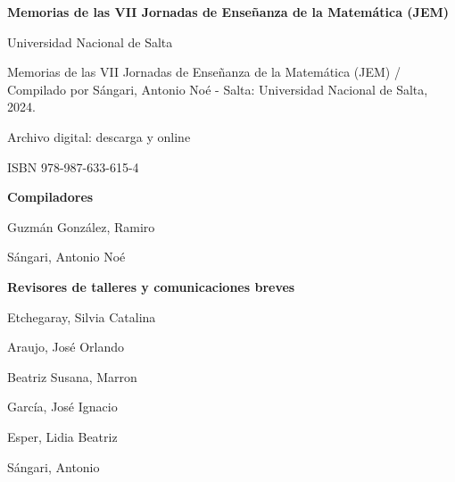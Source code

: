 \begin{center}
	\LARGE \bfseries \sffamily
	Memorias de las VII Jornadas de Enseñanza de la Matemática (JEM)
\end{center}

\vspace*{2.5mm}

\begin{center}
	\begin{tcolorbox}[colback=white, arc=0mm, width=10cm, boxrule=0.5pt]
		\footnotesize
		Universidad Nacional de Salta
		
		\hspace*{1em} Memorias de las VII Jornadas de Enseñanza de la Matemática (JEM) / Compilado por Sángari, Antonio Noé - Salta: Universidad Nacional de Salta, 2024.
		
		\vspace*{1em}
		
		\hspace*{1em} Archivo digital: descarga y online
		
		\hspace*{1em} ISBN 978-987-633-615-4		
	\end{tcolorbox}
\end{center}

\vspace*{2.5mm}

\begin{center}
	\sffamily \Large \bfseries Compiladores
	\vspace*{1mm}
	
	\large \normalfont
	Guzmán González, Ramiro 
	
	Sángari, Antonio Noé 
\end{center}

\vspace*{5mm}

\begin{center}
	\sffamily \Large \bfseries Revisores de talleres y comunicaciones breves
	\large \normalfont
	\begin{multicols}{2}
		 Etchegaray, Silvia Catalina
		 
		 Araujo, José Orlando
		 
		 Beatriz Susana, Marron
		 
		 García, José Ignacio
		 
		 Esper, Lidia Beatriz
		 
		 Sángari, Antonio
	\end{multicols}
\end{center}

